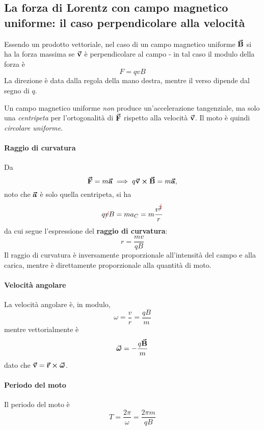 \subsection{La forza di Lorentz con campo magnetico uniforme: il caso perpendicolare alla velocità}
Essendo un prodotto vettoriale, nel caso di un campo magnetico uniforme $\vb*{\va{B}}$ si ha la forza massima se $\vb*{\va{v}}$ è perpendicolare al campo - in tal caso il modulo della forza è
\begin{equation*}
	F=qvB
\end{equation*}
La direzione è data dalla regola della mano destra, mentre il verso dipende dal segno di $q$.\\
\begin{observe}
	Un campo magnetico uniforme \textit{non} produce un'accelerazione tangenziale, ma solo una \textit{centripeta} per l'ortogonalità di $\vb*{\va{F}}$ rispetto alla velocità $\vb*{\va{v}}$. Il moto è quindi \textit{circolare uniforme}. 
\end{observe}
\paragraph{Raggio di curvatura}
Da
\begin{equation*}
	\vb*{\va{F}}=m\vb*{\va{a}}\implies q\vb*{\va{v}}\cross\vb*{\va{B}}=m\vb*{\va{a}},
\end{equation*}
noto che $\vb*{\va{a}}$ è solo quella centripeta, si ha
\begin{equation*}
	q\Ccancel[red]{v}B=ma_C=m\frac{v^{\Ccancel[red]{2}}}{r}
\end{equation*}
da cui segue l'espressione del \textbf{raggio di curvatura}:
\begin{equation}
	r=\frac{mv}{qB}
\end{equation}
Il raggio di curvatura è inversamente proporzionale all'intensità del campo e alla carica, mentre è direttamente proporzionale alla quantità di moto.
\paragraph{Velocità angolare}
La velocità angolare è, in modulo,
\begin{equation}
	\omega=\frac{v}{r}=\frac{qB}{m}
\end{equation}
mentre vettorialmente è
\begin{equation}
	\vb*{\va{\omega}}=-\frac{q\vb*{\va{B}}}{m}
\end{equation}
dato che $\vb*{\va{v}}=\vb*{\va{r}}\cross\vb*{\va{\omega}}$.
\paragraph{Periodo del moto}
Il periodo del moto è
\begin{equation}
	T=\frac{2\pi}{\omega}=\frac{2\pi m}{qB}
\end{equation}
